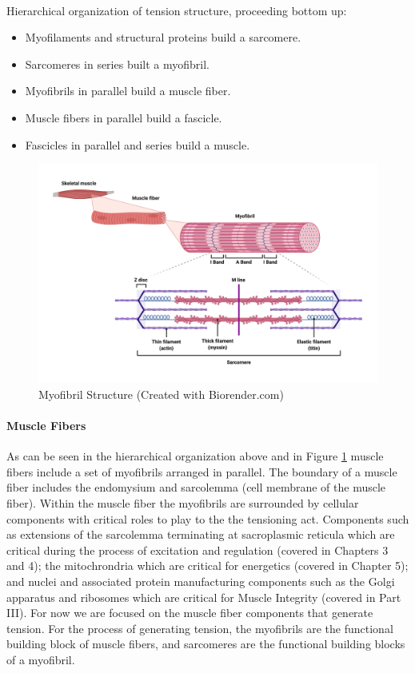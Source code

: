 \paragraph{} 
Hierarchical organization of tension structure, proceeding bottom up: 
\begin{itemize}
\item Myofilaments and structural proteins build a sarcomere. 
\item Sarcomeres in series built a myofibril. 
\item Myofibrils in parallel build a muscle fiber. 
\item Muscle fibers in parallel build a fascicle. 
\item Fascicles in parallel and series build a muscle.
\end{itemize}

\begin{figure}[!ht]
    \centering
    \includegraphics[width=1\linewidth]{./figure/Myofibril_Structure.png}
    \caption{Myofibril Structure \footnotesize{(Created with Biorender.com)}}
    \label{fig:Myofibril_Structure}
\end{figure}

\paragraph{Muscle Fibers} As can be seen in the hierarchical organization above and in Figure \ref{fig:Myofibril_Structure} muscle fibers include a set of myofibrils arranged in parallel. The boundary of a muscle fiber includes the endomysium and sarcolemma (cell membrane of the muscle fiber). Within the muscle fiber the myofibrils are surrounded by cellular components with critical roles to play to the the tensioning act. Components such as extensions of the sarcolemma terminating at sacroplasmic reticula which are critical during the process of excitation and regulation (covered in Chapters 3 and 4); the mitochrondria which are critical for energetics (covered in Chapter 5); and nuclei and associated protein manufacturing components such as the Golgi apparatus and ribosomes which are critical for Muscle Integrity (covered in Part III). For now we are focused on the muscle fiber components that generate tension. For the process of generating tension, the myofibrils are the functional building block of muscle fibers, and sarcomeres are the functional building blocks of a myofibril.



